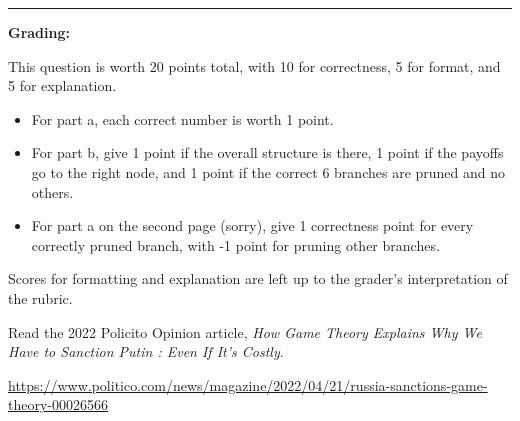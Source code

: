 \documentclass[addpoints]{exam}
\begin{document}
\begin{questions}
\begin{solution}
\begin{parts}
  \noindent\rule[0.5ex]{\linewidth}{1pt}
   
  \textbf{Grading:}

  This question is worth 20 points total, 
  with 10 for correctness, 5 for format, and 5 for explanation.

  \begin{itemize}
  \item 
  For part a, each correct number is worth 1 point.

  \item
  For part b, give 1 point if the overall structure is there,
  1 point if the payoffs go to the right node, 
  and 1 point if the correct 6 branches are pruned and no others.
  
  \item
  For part a on the second page (sorry), 
  give 1 correctness point for every correctly pruned branch,
  with -1 point for pruning other branches.
  \end{itemize}

  Scores for formatting and explanation are left up to the grader's interpretation of the rubric.

\end{parts}
\end{solution}

\newpage


\question%

Read the 2022 Policito Opinion article, 
\textit{How Game Theory Explains Why We Have to Sanction Putin : Even If It’s Costly}.

\url{https://www.politico.com/news/magazine/2022/04/21/russia-sanctions-game-theory-00026566}

\end{questions}
\end{document}
